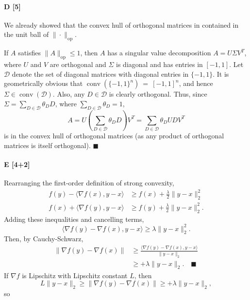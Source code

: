 \documentclass[11pt]{article}
\newcommand{\qed}{\quad \ensuremath{\blacksquare}}
\newcommand{\D}{\mathcal{D}}
\newcommand{\conv}{\operatorname{conv}}
\newcommand{\op}{{\operatorname{op}}}
\begin{document}
\paragraph{D [5]} We already showed that the convex hull of orthogonal matrices
in contained in the unit ball of $\|\cdot\|_\op$.

If $A$ satisfies
$\|A\|_\op \leq 1$, then $A$ has a singular value decomposition
$A = U\Sigma V^T$, where $U$ and $V$ are orthogonal and $\Sigma$ is diagonal
and has entries in $[-1,1]$. Let $\D$ denote the set of diagonal matrices with
diagonal entries in $\{-1,1\}$. It is geometrically obvious that
$\conv\left(\{-1,1\}^n\right)~=~[-1,1]^n$, and hence $\Sigma \in \conv(\D)$.
Also, any $D \in \D$ is clearly orthogonal. Thus, since
$\Sigma = \sum_{D \in \D} \theta_D D$, where $\sum_{D \in \D} \theta_D = 1$,
\[A
    = U \left( \sum_{D \in \D} \theta_D D \right) V^T
    = \sum_{D \in \D} \theta_D UDV^T
\]
is in the convex hull of orthogonal matrices (as any product of orthogonal
matrices is itself orthogonal). \qed

\paragraph{E [4+2]} Rearranging the first-order definition of strong convexity,
\begin{align*}
f(y) - \langle \nabla f(x), y - x \rangle
    & \geq f(x) + \frac{\lambda}{2}\|y - x\|_2^2    \\
f(x) + \langle \nabla f(y), y - x \rangle
    & \geq f(y) + \frac{\lambda}{2}\|y - x\|_2^2.
\end{align*}
Adding these inequalities and cancelling terms,
\[\langle \nabla f(y) - \nabla f(x), y - x \rangle
    \geq \lambda\|y - x\|_2^2.\]
Then, by Cauchy-Schwarz,
\begin{align*}
\|\nabla f(y) - \nabla f(x)\|
 &  \geq \frac{\langle \nabla f(y) - \nabla f(x), y - x \rangle}{\|y - x\|_2}\\
 &  \geq + \lambda\|y - x\|_2. \qed
\end{align*}
If $\nabla f$ is Lipschitz with Lipschitz constant $L$, then
\[L\|y - x\|_2 \geq \|\nabla f(y) - \nabla f(x)\| \geq + \lambda\|y - x\|_2,\]
so 
\end{document}

